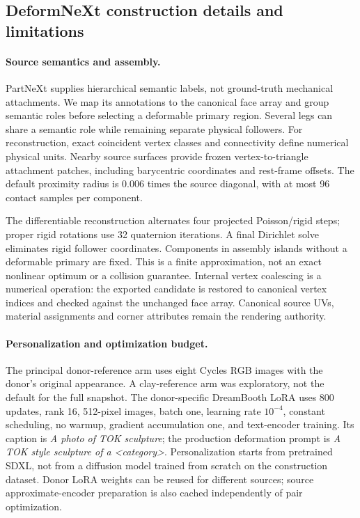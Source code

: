 \subsection{DeformNeXt construction details and limitations}
\label{sec:data-construction-details}
\paragraph{Source semantics and assembly.}
PartNeXt supplies hierarchical semantic labels, not ground-truth mechanical
attachments. We map its annotations to the canonical face array and group
semantic roles before selecting a deformable primary region. Several legs
can share a semantic role while remaining separate physical followers.
For reconstruction, exact coincident vertex classes and connectivity define
numerical physical units. Nearby source surfaces provide frozen
vertex-to-triangle attachment patches, including barycentric coordinates
and rest-frame offsets. The default proximity radius is 0.006 times the
source diagonal, with at most 96 contact samples per component.

The differentiable reconstruction alternates four projected Poisson/rigid
steps; proper rigid rotations use 32 quaternion iterations. A final
Dirichlet solve eliminates rigid follower coordinates. Components in
assembly islands without a deformable primary are fixed. This is a finite
approximation, not an exact nonlinear optimum or a collision guarantee.
Internal vertex coalescing is a numerical operation: the exported candidate
is restored to canonical vertex indices and checked against the unchanged
face array. Canonical source UVs, material assignments and corner attributes
remain the rendering authority.

\paragraph{Personalization and optimization budget.}
The principal donor-reference arm uses eight Cycles RGB images with the
donor's original appearance. A clay-reference arm was exploratory, not the
default for the full snapshot. The donor-specific DreamBooth LoRA uses
800 updates, rank 16, 512-pixel images, batch one, learning rate $10^{-4}$,
constant scheduling, no warmup, gradient accumulation one, and text-encoder
training. Its caption is \emph{A photo of TOK sculpture}; the production
deformation prompt is \emph{A TOK style sculpture of a <category>}.
Personalization starts from pretrained SDXL, not from a diffusion model
trained from scratch on the construction dataset. Donor LoRA weights can
be reused for different sources; source approximate-encoder preparation is
also cached independently of pair optimization.

